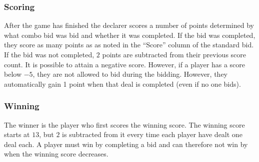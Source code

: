 \documentclass[a4paper]{article}
\begin{document}
{{			\subsubsection{Scoring}{%
				After the game has finished the declarer scores a number of points determined by what combo bid was bid and whether it was completed. If the bid was completed, they score as many points as as noted in the ``Score'' column of the standard bid. If the bid was not completed, $2$ points are subtracted from their previous score count. It is possible to attain a negative score. However, if a player has a score below $-5$, they are not allowed to bid during the bidding. However, they automatically gain 1 point when that deal is completed (even if no one bids).
			}

			\subsubsection{Winning}{%
				The winner is the player who first scores the winning score. The winning score starts at $13$, but $2$ is subtracted from it every time each player have dealt one deal each. A player must win by completing a bid and can therefore not win by when the winning score decreases.
			}
		}
	}
\end{document}
